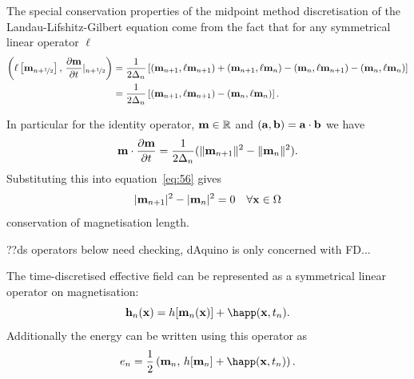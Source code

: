 The special conservation properties of the midpoint method discretisation of the Landau-Lifshitz-Gilbert equation come from the fact that for any symmetrical linear operator $\ell$
\begin{align}
  \label{eq:54}
  \left(\ell \left[ \mathbf{m}_{n+\nicefrac{1}{2}} \right],\,  \frac{\partial \mathbf{m}}{\partial t} \lvert_{n+\nicefrac{1}{2}} \right)
  &= \frac{1}{2\Delta_{n}} \left[
    (\mathbf{m}_{n+1} , \ell \mathbf{m}_{n+1})
    + (\mathbf{m}_{n+1} , \ell \mathbf{m}_{n})
    - (\mathbf{m}_{n} , \ell \mathbf{m}_{n+1})
    - (\mathbf{m}_{n} , \ell \mathbf{m}_{n})
    \right] \notag\\
  &= \frac{1}{2\Delta_{n}} \left[
    (\mathbf{m}_{n+1} , \ell \mathbf{m}_{n+1})
    - (\mathbf{m}_{n} , \ell \mathbf{m}_{n})
    \right].
\end{align}

In particular for the identity operator, $\mathbf{m} \in \mathbb{R}$ and $({\mathbf{a}}, {\mathbf{b}}) = {\mathbf{a}} \cdot {\mathbf{b}}$ we have
\begin{equation}
  \label{eq:52}
  \mathbf{m} \cdot \frac{\partial \mathbf{m}}{\partial t}  = \frac{1}{2\Delta_{n}} (\lVert \mathbf{m}_{n+1} \rVert^2 - \lVert \mathbf{m}_{n} \rVert^2 ).
\end{equation}
Substituting this into equation~\eqref{eq:56} gives
\begin{equation}
  \lvert \mathbf{m}_{n+1}  \rvert^2 - \lvert \mathbf{m}_{n} \rvert^2 = 0 \quad \forall \mathbf{x} \in \Omega
\end{equation}
\ie conservation of magnetisation length.

??ds operators below need checking, dAquino is only concerned with FD...

The time-discretised effective field can be represented as a symmetrical linear operator on magnetisation:\cite{DAquino2005}
\begin{equation}
  \label{eq:hop}
  \hv_n(\xv) = \hop [\mv_n(\xv)] + \happ(\xv, t_n).
\end{equation}
Additionally the energy can be written using this operator as
\begin{equation}
  \label{eq:energy-hop}
  \e_n = \frac{1}{2} \ip{\mv_n}{\hop[\mv_n] + \happ(\xv,t_n)}.
\end{equation}

